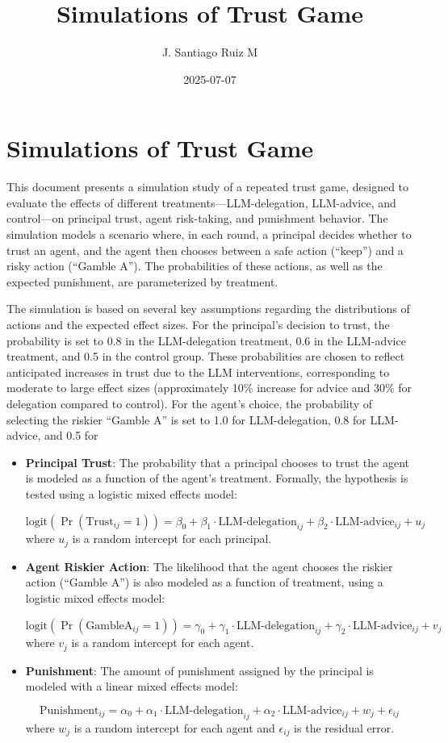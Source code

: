 \documentclass[
]{article}
\title{Simulations of Trust Game}
\author{J. Santiago Ruiz M}
\date{2025-07-07}
\begin{document}
\maketitle

\section{Simulations of Trust Game}\label{simulations-of-trust-game}

This document presents a simulation study of a repeated trust game,
designed to evaluate the effects of different
treatments---LLM-delegation, LLM-advice, and control---on principal
trust, agent risk-taking, and punishment behavior. The simulation models
a scenario where, in each round, a principal decides whether to trust an
agent, and the agent then chooses between a safe action (``keep'') and a
risky action (``Gamble A''). The probabilities of these actions, as well
as the expected punishment, are parameterized by treatment.

The simulation is based on several key assumptions regarding the
distributions of actions and the expected effect sizes. For the
principal's decision to trust, the probability is set to 0.8 in the
LLM-delegation treatment, 0.6 in the LLM-advice treatment, and 0.5 in
the control group. These probabilities are chosen to reflect anticipated
increases in trust due to the LLM interventions, corresponding to
moderate to large effect sizes (approximately 10\% increase for advice
and 30\% for delegation compared to control). For the agent's choice,
the probability of selecting the riskier ``Gamble A'' is set to 1.0 for
LLM-delegation, 0.8 for LLM-advice, and 0.5 for

\begin{itemize}
\item
  \textbf{Principal Trust}: The probability that a principal chooses to
  trust the agent is modeled as a function of the agent's treatment.
  Formally, the hypothesis is tested using a logistic mixed effects
  model:

  \[
  \text{logit}(\Pr(\text{Trust}_{ij} = 1)) = \beta_0 + \beta_1 \cdot \text{LLM-delegation}_{ij} + \beta_2 \cdot \text{LLM-advice}_{ij} + u_j
  \] where \(u_j\) is a random intercept for each principal.
\item
  \textbf{Agent Riskier Action}: The likelihood that the agent chooses
  the riskier action (``Gamble A'') is also modeled as a function of
  treatment, using a logistic mixed effects model:

  \[
  \text{logit}(\Pr(\text{GambleA}_{ij} = 1)) = \gamma_0 + \gamma_1 \cdot \text{LLM-delegation}_{ij} + \gamma_2 \cdot \text{LLM-advice}_{ij} + v_j
  \] where \(v_j\) is a random intercept for each agent.
\item
  \textbf{Punishment}: The amount of punishment assigned by the
  principal is modeled with a linear mixed effects model:

  \[
  \text{Punishment}_{ij} = \alpha_0 + \alpha_1 \cdot \text{LLM-delegation}_{ij} + \alpha_2 \cdot \text{LLM-advice}_{ij} + w_j + \epsilon_{ij}
  \] where \(w_j\) is a random intercept for each agent and
  \(\epsilon_{ij}\) is the residual error.
\end{itemize}
\end{document}
